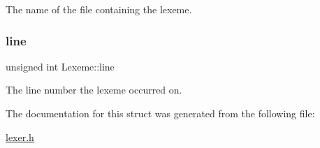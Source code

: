 The name of the file containing the lexeme. \mbox{\label{struct_lexeme_af75c22856308b5e1cafcbac2d9308bf0}} 
\subsubsection{\texorpdfstring{line}{line}}
{\footnotesize\ttfamily unsigned int Lexeme\+::line}

The line number the lexeme occurred on. 

The documentation for this struct was generated from the following file\+:\begin{DoxyCompactItemize}
\item 
\hyperlink{lexer_8h}{lexer.\+h}\end{DoxyCompactItemize}
